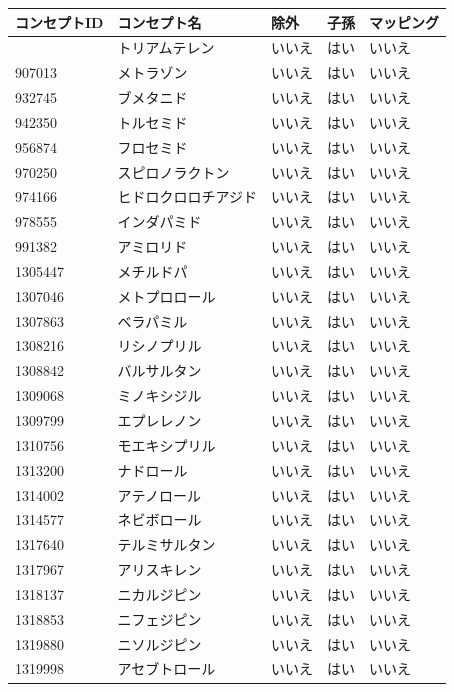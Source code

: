 \documentclass[
  11pt]{book}
\theoremstyle{definition}
\theoremstyle{definition}
\theoremstyle{definition}
\theoremstyle{definition}
\theoremstyle{remark}
\begin{document}
\begin{longtable}[]{@{}lllll@{}}
\toprule\noalign{}
コンセプトID & コンセプト名 & 除外 & 子孫 & マッピング \\
\midrule\noalign{}
\endhead
\bottomrule\noalign{}
\endlastfoot
904542 & トリアムテレン & いいえ & はい & いいえ \\
907013 & メトラゾン & いいえ & はい & いいえ \\
932745 & ブメタニド & いいえ & はい & いいえ \\
942350 & トルセミド & いいえ & はい & いいえ \\
956874 & フロセミド & いいえ & はい & いいえ \\
970250 & スピロノラクトン & いいえ & はい & いいえ \\
974166 & ヒドロクロロチアジド & いいえ & はい & いいえ \\
978555 & インダパミド & いいえ & はい & いいえ \\
991382 & アミロリド & いいえ & はい & いいえ \\
1305447 & メチルドパ & いいえ & はい & いいえ \\
1307046 & メトプロロール & いいえ & はい & いいえ \\
1307863 & ベラパミル & いいえ & はい & いいえ \\
1308216 & リシノプリル & いいえ & はい & いいえ \\
1308842 & バルサルタン & いいえ & はい & いいえ \\
1309068 & ミノキシジル & いいえ & はい & いいえ \\
1309799 & エプレレノン & いいえ & はい & いいえ \\
1310756 & モエキシプリル & いいえ & はい & いいえ \\
1313200 & ナドロール & いいえ & はい & いいえ \\
1314002 & アテノロール & いいえ & はい & いいえ \\
1314577 & ネビボロール & いいえ & はい & いいえ \\
1317640 & テルミサルタン & いいえ & はい & いいえ \\
1317967 & アリスキレン & いいえ & はい & いいえ \\
1318137 & ニカルジピン & いいえ & はい & いいえ \\
1318853 & ニフェジピン & いいえ & はい & いいえ \\
1319880 & ニソルジピン & いいえ & はい & いいえ \\
1319998 & アセブトロール & いいえ & はい & いいえ \\

\end{longtable}
\end{document}
